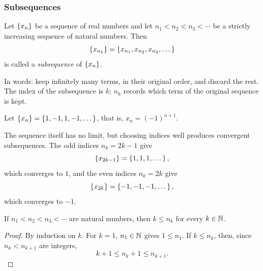 \subsubsection{Subsequences}
\begin{definition}[Subsequence]\label{def:subsequence}
    Let $\left\{x_n\right\}$ be a sequence of real numbers and let $n_1 < n_2 < n_3 < \cdots$ be a strictly increasing sequence of natural numbers. Then
    \begin{equation*}
        \left\{x_{n_k}\right\} = \left\{x_{n_1}, x_{n_2}, x_{n_3}, \dots\right\}
    \end{equation*}
    is called a \emph{subsequence} of $\left\{x_n\right\}$.
\end{definition}
In words: keep infinitely many terms, in their original order, and discard the rest. The index of the subsequence is $k$; $n_k$ records which term of the original sequence is kept.

\begin{example}\label{ex:alternating-subsequences}
    Let $\left\{x_n\right\}=\left\{1,-1,1,-1,\dots\right\}$, that is, $x_n=(-1)^{n+1}$.
\end{example}
The sequence itself has no limit, but choosing indices well produces convergent subsequences. The odd indices $n_k=2k-1$ give
\begin{equation*}
    \left\{x_{2k - 1}\right\} = \left\{1, 1, 1, \dots\right\},
\end{equation*}
which converges to $1$, and the even indices $n_k=2k$ give
\begin{equation*}
    \left\{x_{2k}\right\} = \left\{-1, -1, -1, \dots\right\},
\end{equation*}
which converges to $-1$.

\begin{lemma}\label{lem:subsequence-index}
    If $n_1<n_2<n_3<\cdots$ are natural numbers, then $k\leq n_k$ for every $k\in\mathbb{N}$.
\end{lemma}
\begin{proof}
    By induction on $k$. For $k=1$, $n_1\in\mathbb{N}$ gives $1\leq n_1$. If $k\leq n_k$, then, since $n_k<n_{k+1}$ are integers,
    \begin{equation*}
        k + 1 \leq n_k + 1 \leq n_{k + 1}.
    \end{equation*}
\end{proof}

